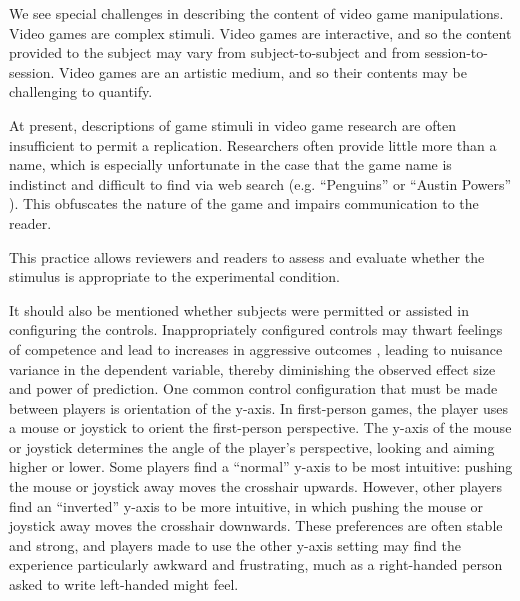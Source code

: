 We see special challenges in describing the content of video game manipulations. Video games are complex stimuli. Video games are interactive, and so the content provided to the subject may vary from subject-to-subject and from session-to-session. Video games are an artistic medium, and so their contents may be challenging to quantify. %


At present, descriptions of game stimuli in video game research are often insufficient to permit a replication. Researchers often provide little more than a name, which is especially unfortunate in the case that the game name is indistinct and difficult to find via web search (e.g. “Penguins” \citep{(Greitemeyer:2014} or “Austin Powers” \citep{Bushman:Anderson:2002}). This obfuscates the nature of the game and impairs communication to the reader.

This practice allows reviewers and readers to assess and evaluate whether the stimulus is appropriate to the experimental condition. 

It should also be mentioned whether subjects were permitted or assisted in configuring the controls. Inappropriately configured controls may thwart feelings of competence and lead to increases in aggressive outcomes \citep{Przybylski:etal:2014}, leading to nuisance variance in the dependent variable, thereby diminishing the observed effect size and power of prediction. One common control configuration that must be made between players is orientation of the y-axis. In first-person games, the player uses a mouse or joystick to orient the first-person perspective. The y-axis of the mouse or joystick determines the angle of the player's perspective, looking and aiming higher or lower. Some players find a ``normal'' y-axis to be most intuitive: pushing the mouse or joystick away moves the crosshair upwards. However, other players find an ``inverted'' y-axis to be more intuitive, in which pushing the mouse or joystick away moves the crosshair downwards. These preferences are often stable and strong, and players made to use the other y-axis setting may find the experience particularly awkward and frustrating, much as a right-handed person asked to write left-handed might feel.

